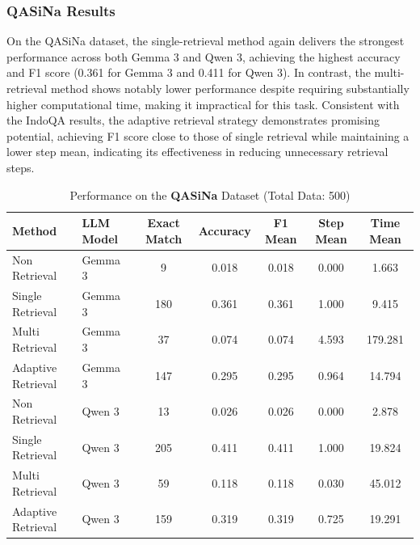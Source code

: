 \documentclass[times]{iapress}
\begin{document}
\subsubsection{QASiNa Results}
On the QASiNa dataset, the single-retrieval method again delivers the strongest performance across both Gemma 3 and Qwen 3, achieving the highest accuracy and F1 score (0.361 for Gemma 3 and 0.411 for Qwen 3). In contrast, the multi-retrieval method shows notably lower performance despite requiring substantially higher computational time, making it impractical for this task. Consistent with the IndoQA results, the adaptive retrieval strategy demonstrates promising potential, achieving F1 score close to those of single retrieval while maintaining a lower step mean, indicating its effectiveness in reducing unnecessary retrieval steps.

\begin{table}[htbp]
  \footnotesize
  \caption{Performance on the \textbf{QASiNa} Dataset (Total Data: 500)}
  \label{tab:qasina_performance}
  \begin{tabularx}{\textwidth}{@{}L L C C C C C@{}}
    \toprule
    \textbf{Method} & \textbf{LLM Model} & \textbf{Exact Match} & \textbf{Accuracy} & \textbf{F1 Mean} & \textbf{Step Mean} & \textbf{Time Mean} \\
    \midrule
    Non Retrieval & Gemma 3 & 9 & 0.018 & 0.018 & 0.000 & 1.663 \\
    Single Retrieval & Gemma 3 & 180 & 0.361 & 0.361 & 1.000 & 9.415 \\
    Multi Retrieval & Gemma 3 & 37 & 0.074 & 0.074 & 4.593 & 179.281 \\
    \midrule
    Adaptive Retrieval & Gemma 3 & 147 & 0.295 & 0.295 & 0.964 & 14.794 \\
    \midrule
    Non Retrieval & Qwen 3 & 13 & 0.026 & 0.026 & 0.000 & 2.878 \\
    Single Retrieval & Qwen 3 & 205 & 0.411 & 0.411 & 1.000 & 19.824 \\
    Multi Retrieval & Qwen 3 & 59 & 0.118 & 0.118 & 0.030 & 45.012 \\
    \midrule
    Adaptive Retrieval & Qwen 3 & 159 & 0.319 & 0.319 & 0.725 & 19.291 \\
    \bottomrule
  \end{tabularx}
\end{table}
\end{document}
